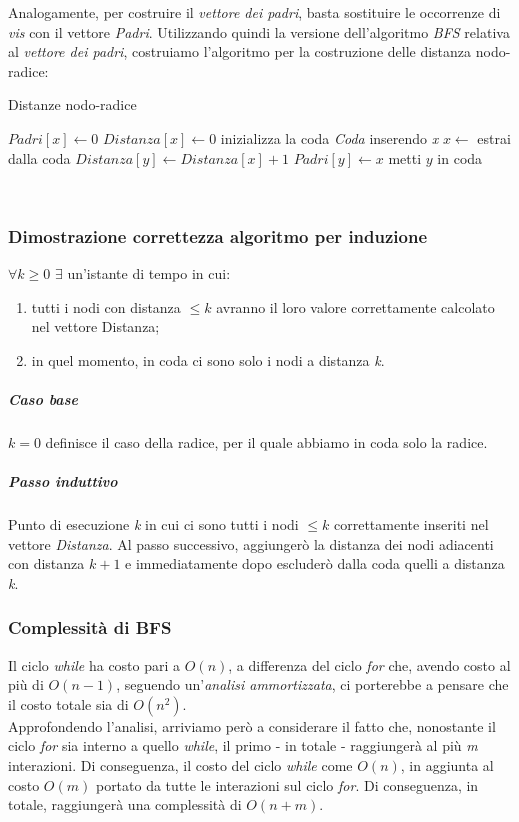 Analogamente, per costruire il \textit{vettore dei padri}, basta sostituire le occorrenze di \textit{vis} con il vettore \textit{Padri}. Utilizzando quindi la versione dell'algoritmo \textit{BFS} relativa al \textit{vettore dei padri}, costruiamo l'algoritmo per la costruzione delle distanza nodo-radice:
\begin{algorithm}
	\caption{Distanze nodo-radice}\label{alg:disNR}
	\begin{algorithmic}[1]
			\State $Padri[x] \gets 0$
			\State $Distanza[x] \gets 0$
			\State inizializza la coda \textit{Coda} inserendo \textit{x}
				\State $x \gets $ estrai dalla coda
						\State $Distanza[y] \gets Distanza[x] + 1$
						\State $Padri[y] \gets x$
						\State metti $y$ in coda
					\EndIf
				\EndFor
			\EndWhile
		\EndFunction
	\end{algorithmic}
\end{algorithm} \hfill \\
\newpage

\subsubsection{Dimostrazione correttezza algoritmo per induzione}
$\forall k \geq 0$ $\exists$ un'istante di tempo in cui:
\begin{enumerate}
    \item tutti i nodi con distanza $\leq k$ avranno il loro valore correttamente calcolato nel vettore Distanza;
    \item in quel momento, in coda ci sono solo i nodi a distanza \textit{k}.
\end{enumerate}
\subparagraph{Caso base}
$k=0$ definisce il caso della radice, per il quale abbiamo in coda solo la radice.
\subparagraph{Passo induttivo}
Punto di esecuzione \textit{k} in cui ci sono tutti i nodi $\leq k$ correttamente inseriti nel vettore \textit{Distanza}. Al passo successivo, aggiungerò la distanza dei nodi adiacenti con distanza $k+1$ e immediatamente dopo escluderò dalla coda quelli a distanza \textit{k}.

\subsubsection{Complessità di BFS}
Il ciclo \textit{while} ha costo pari a $O(n)$, a differenza del ciclo \textit{for} che, avendo costo al più di $O(n-1)$, seguendo un'\textit{analisi ammortizzata}, ci porterebbe a pensare che il costo totale sia di $O(n^2)$. \\
Approfondendo l'analisi, arriviamo però a considerare il fatto che, nonostante il ciclo \textit{for} sia interno a quello \textit{while}, il primo - in totale - raggiungerà al più \textit{m} interazioni. Di conseguenza, il costo del ciclo \textit{while} come $O(n)$, in aggiunta al costo $O(m)$ portato da tutte le interazioni sul ciclo \textit{for}. Di conseguenza, in totale, raggiungerà una complessità di $O(n+m)$.

